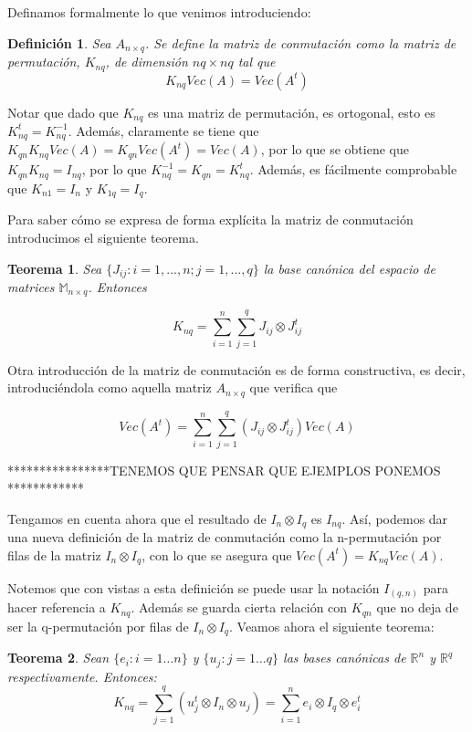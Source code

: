 \documentclass{article}
\theoremstyle{theorem-style}  %
\newtheorem{theorem}{Teorema}[section]  %
\theoremstyle{definition}
\newtheorem{definition}{Definición}[section]
\theoremstyle{example-style}
\begin{document}
Definamos formalmente lo que venimos introduciendo:

\begin{definition}	
	\textit{Sea $A_{n \times q}$. Se define la matriz de conmutación como la matriz de permutación, $K_{nq}$, de dimensión $nq \times nq$ tal que} $$K_{nq}Vec(A) = Vec(A^t)$$
	
\end{definition}


Notar que dado que $K_{nq}$ es una matriz de permutación, es ortogonal, esto es $K_{nq}^t = K_{nq}^{-1}$. Además, claramente se tiene que $K_{qn}K_{nq} Vec(A) = K_{qn} Vec(A^t) = Vec(A)$, por lo que se obtiene que $K_{qn} K_{nq} = I_{nq}$, por lo que $K_{nq}^{-1} = K_{qn} = K_{nq}^t$. Además, es fácilmente comprobable que $K_{n1} = I_n$ y $K_{1q} = I_q$.

Para saber cómo se expresa de forma explícita la matriz de conmutación introducimos el siguiente teorema.

\begin{theorem}
	\textit{Sea $\{J_{ij}: i = 1, ..., n; j = 1,..., q\}$ la base canónica del espacio de matrices $\mathbb{M}_{n \times q}$. Entonces}
	
	$$K_{nq} = \sum_{i=1}^{n} \sum_{j=1}^{q} J_{ij} \otimes J_{ij}^t$$
\end{theorem}

Otra introducción de la matriz de conmutación es de forma constructiva, es decir, introduciéndola como aquella matriz $A_{n \times q}$ que verifica que

$$
	Vec(A^t) = \sum_{i=1}^{n} \sum_{j=1}^{q}(J_{ij} \otimes J_{ij}^t) Vec(A)
$$

****************TENEMOS QUE PENSAR QUE EJEMPLOS PONEMOS ************

Tengamos en cuenta ahora que el resultado de $I_n \otimes I_q$ es $I_{nq}$. Así, podemos dar una nueva definición de la matriz de conmutación como la n-permutación por filas de la matriz $I_n \otimes I_q$, con lo que se asegura que  $Vec(A^t)= K_{nq}Vec(A)$.

Notemos que con vistas a esta definición se puede usar la notación $I_{(q,n)}$ para hacer referencia a $K_{nq}$. Además se guarda cierta relación con $K_{qn}$ que no deja de ser la q-permutación por filas de $I_n \otimes I_q$. Veamos ahora el siguiente teorema:

\begin{theorem}
	Sean $\{e_i:i=1 \dots n\}$ y $\{u_j:j=1 \dots q\}$ las bases canónicas de $\mathbb{R}^n$ y $\mathbb{R}^q$ respectivamente. Entonces:
		$$ K_{nq}=\sum_{j=1}^{q} (u_j^t \otimes  I_n \otimes u_j) = \sum_{i=1}^{n} e_i \otimes I_q \otimes e_i^t$$
\end{theorem}
\end{document}
